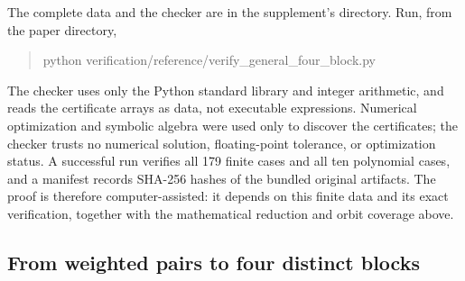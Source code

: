 The complete data  and the
checker  are in the supplement's
 directory. Run, from the paper directory,
\begin{quote}\small\ttfamily
python verification/reference/verify\_general\_four\_block.py
\end{quote}
The checker uses only the Python standard library and integer arithmetic,
and reads the certificate arrays as data, not executable expressions.
Numerical optimization and symbolic algebra were used only to discover the
certificates; the checker trusts no numerical solution, floating-point
tolerance, or optimization status. A successful run verifies all 179 finite
cases and all ten polynomial cases, and a manifest records SHA-256 hashes of
the bundled original artifacts. The proof is therefore computer-assisted: it
depends on this finite data and its exact verification, together with the
mathematical reduction and orbit coverage above.

\subsection{From weighted pairs to four distinct blocks}

